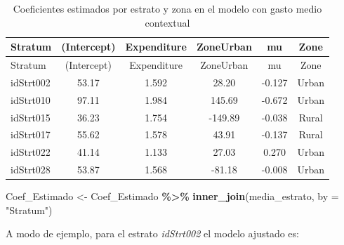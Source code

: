 \documentclass[
  spanish,
  12pt,
]{book}
\newenvironment{Shaded}{\begin{snugshade}}{\end{snugshade}}
\newcommand{\AttributeTok}[1]{\textcolor[rgb]{0.13,0.29,0.53}{#1}}
\newcommand{\FunctionTok}[1]{\textcolor[rgb]{0.13,0.29,0.53}{\textbf{#1}}}
\newcommand{\NormalTok}[1]{#1}
\newcommand{\OtherTok}[1]{\textcolor[rgb]{0.56,0.35,0.01}{#1}}
\newcommand{\SpecialCharTok}[1]{\textcolor[rgb]{0.81,0.36,0.00}{\textbf{#1}}}
\newcommand{\StringTok}[1]{\textcolor[rgb]{0.31,0.60,0.02}{#1}}
\begin{document}
\begin{Shaded}
\end{Shaded}

\begin{longtable}[]{@{}lccccc@{}}
\caption{\label{tab:tab-coef-zona}Coeficientes estimados por estrato y zona en el modelo con gasto medio contextual}\tabularnewline
\toprule\noalign{}
Stratum & (Intercept) & Expenditure & ZoneUrban & mu & Zone \\
\midrule\noalign{}
\endfirsthead
\toprule\noalign{}
Stratum & (Intercept) & Expenditure & ZoneUrban & mu & Zone \\
\midrule\noalign{}
\endhead
\bottomrule\noalign{}
\endlastfoot
idStrt002 & 53.17 & 1.592 & 28.20 & -0.127 & Urban \\
idStrt010 & 97.11 & 1.984 & 145.69 & -0.672 & Urban \\
idStrt015 & 36.23 & 1.754 & -149.89 & -0.038 & Rural \\
idStrt017 & 55.62 & 1.578 & 43.91 & -0.137 & Rural \\
idStrt022 & 41.14 & 1.133 & 27.03 & 0.270 & Urban \\
idStrt028 & 53.87 & 1.568 & -81.18 & -0.008 & Urban \\
\end{longtable}

\begin{Shaded}
\begin{Highlighting}[]
\NormalTok{Coef\_Estimado }\OtherTok{\textless{}{-}}\NormalTok{ Coef\_Estimado }\SpecialCharTok{\%\textgreater{}\%} \FunctionTok{inner\_join}\NormalTok{(media\_estrato, }\AttributeTok{by =} \StringTok{"Stratum"}\NormalTok{)}
\end{Highlighting}
\end{Shaded}

A modo de ejemplo, para el estrato \emph{idStrt002} el modelo ajustado es:
\end{document}

